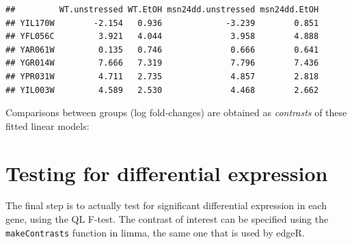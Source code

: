 \documentclass[
]{book}
\newenvironment{Shaded}{\begin{snugshade}}{\end{snugshade}}
\newcommand{\CommentTok}[1]{\textcolor[rgb]{0.56,0.35,0.01}{\textit{#1}}}
\begin{document}
\begin{verbatim}
##         WT.unstressed WT.EtOH msn24dd.unstressed msn24dd.EtOH
## YIL170W        -2.154   0.936             -3.239        0.851
## YFL056C         3.921   4.044              3.958        4.888
## YAR061W         0.135   0.746              0.666        0.641
## YGR014W         7.666   7.319              7.796        7.436
## YPR031W         4.711   2.735              4.857        2.818
## YIL003W         4.589   2.530              4.468        2.662
\end{verbatim}

\begin{Shaded}
\end{Shaded}

Comparisons between groups (log fold-changes) are obtained as
\emph{contrasts} of these fitted linear models:

\hypertarget{testing-for-differential-expression-2}{%
\section{Testing for differential expression}\label{testing-for-differential-expression-2}}

The final step is to actually test for significant differential
expression in each gene, using the QL F-test. The contrast of interest
can be specified using the \texttt{makeContrasts} function in limma, the same
one that is used by edgeR.
\end{document}
